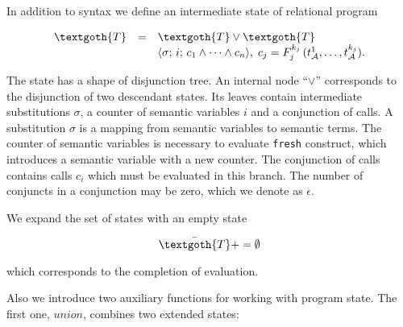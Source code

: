 
In addition to syntax we define an intermediate state of relational program

\[
\begin{array}{rcl}
  \textgoth{T} & = & \textgoth{T} \lor \textgoth{T}\\
               &   & \inbr{\sigma;\, i;\, c_1 \land \dots \land c_n},\; c_j = F_j^{k_j}\,(t_\mathcal{A}^1,\dots,t_\mathcal{A}^{k_j}).
\end{array}
\]

The state has a shape of disjunction tree. An internal node ``$\lor$'' corresponds to the disjunction of two descendant states.
Its leaves contain intermediate substitutions $\sigma$, a counter of semantic variables $i$ and a conjunction of calls. A substitution $\sigma$ is a
mapping from semantic variables to semantic terms. The counter of semantic variables is necessary to evaluate \lstinline{fresh} construct,
which introduces a semantic variable with a new counter. The conjunction of calls contains calls $c_i$ which must be evaluated in this branch.
The number of conjuncts in a conjunction may be zero, which we denote as $\epsilon$.


We expand the set of states with an empty state

\[
\bar{\textgoth{T}} += \emptyset
\]

which corresponds to the completion of evaluation.

Also we introduce two auxiliary functions for working with program state. The first one,  $union$, combines two extended states:

